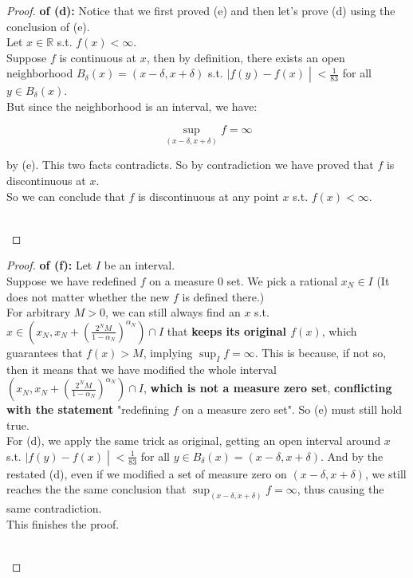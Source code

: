 \documentclass{qlnotes-export}
\begin{document}
\begin{proof}

\textbf{of (d):} Notice that we first proved (e) and then let's prove (d) using the conclusion of (e).\\
Let \(x \in {\mathbb{R}}\) s.t. \(f(x) < \infty\).\\
Suppose \(f\) is continuous at \(x\), then by definition, there exists an open neighborhood \(B_{\delta}(x) = (x - \delta,x + \delta)\) s.t. \(\left. |f(y) - f(x) \middle| < \frac{1}{83} \right.\) for all \(y \in B_{\delta}(x)\).\\
But since the neighborhood is an interval, we have:

\[\sup\limits_{(x - \delta,x + \delta)}f = \infty\]

by (e). This two facts contradicts. So by contradiction we have proved that \(f\) is discontinuous at \(x\).\\
So we can conclude that \(f\) is discontinuous at any point \(x\) s.t. \(f(x) < \infty\).\\
\strut \\

\end{proof}

\begin{proof}

\textbf{of (f):} Let \(I\) be an interval.\\
Suppose we have redefined \(f\) on a measure \(0\) set. We pick a rational \(x_{N} \in I\) (It does not matter whether the new \(f\) is defined there.)\\
For arbitrary \(M > 0\), we can still always find an \(x\) s.t. \(x \in (x_{N},x_{N} + (\frac{2^{N}M}{1 - \alpha_{N}})^{\alpha_{N}}) \cap I\) that \textbf{keeps its original \(f(x)\)}, which guarantees that \(f(x) > M\), implying \(\sup_{I}f = \infty\). This is because, if not so, then it means that we have modified the whole interval \((x_{N},x_{N} + (\frac{2^{N}M}{1 - \alpha_{N}})^{\alpha_{N}}) \cap I\), \textbf{which is not a measure zero set}, \textbf{conflicting with the statement} "redefining \(f\) on a measure zero set". So (e) must still hold true.\\
For (d), we apply the same trick as original, getting an open interval around \(x\) s.t. \(\left. |f(y) - f(x) \middle| < \frac{1}{83} \right.\) for all \(y \in B_{\delta}(x) = (x - \delta,x + \delta)\). And by the restated (d), even if we modified a set of measure zero on \((x - \delta,x + \delta)\), we still reaches the the same conclusion that \(\sup_{(x - \delta,x + \delta)}f = \infty\), thus causing the same contradiction.\\
This finishes the proof.\\
\strut \\

\end{proof}
\end{document}
